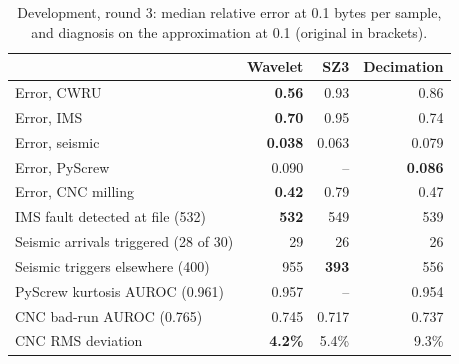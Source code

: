 \documentclass[sigconf,nonacm]{acmart}
\begin{document}
\begin{table}[t]
\caption{Development, round 3: median relative error at 0.1 bytes per sample, and diagnosis on the approximation at 0.1 (original in brackets).}
\label{tab:dev}
\small
\begin{tabularx}{\columnwidth}{@{}Xrrr@{}}
\toprule
& Wavelet & SZ3 & Decimation \\
\midrule
Error, CWRU & \textbf{0.56} & 0.93 & 0.86 \\
Error, IMS & \textbf{0.70} & 0.95 & 0.74 \\
Error, seismic & \textbf{0.038} & 0.063 & 0.079 \\
Error, PyScrew & 0.090 & -- & \textbf{0.086} \\
Error, CNC milling & \textbf{0.42} & 0.79 & 0.47 \\
\midrule
IMS fault detected at file (532) & \textbf{532} & 549 & 539 \\
Seismic arrivals triggered (28 of 30) & 29 & 26 & 26 \\
Seismic triggers elsewhere (400) & 955 & \textbf{393} & 556 \\
PyScrew kurtosis AUROC (0.961) & 0.957 & -- & 0.954 \\
CNC bad-run AUROC (0.765) & 0.745 & 0.717 & 0.737 \\
CNC RMS deviation & \textbf{4.2\%} & 5.4\% & 9.3\% \\
\bottomrule
\end{tabularx}
\end{table}
\end{document}
